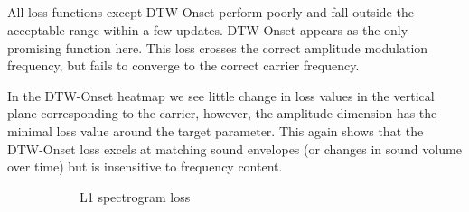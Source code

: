 \subsection{\FMMod}
All loss functions except DTW-Onset perform poorly and fall outside the acceptable range within a few updates. DTW-Onset appears as the only promising function here. This loss crosses the correct amplitude modulation frequency, but fails to converge to the correct carrier frequency. 

In the DTW-Onset heatmap we see little change in loss values in the vertical plane corresponding to the carrier, however, the amplitude dimension has the minimal loss value around the target parameter. This again shows that the DTW-Onset loss excels at matching sound envelopes (or changes in sound volume over time) but is insensitive to frequency content. 
\begin{figure}[htbp]
    \centering
    \begin{subfigure}[b]{0.49\textwidth}
        \centering
        \caption{L1 spectrogram loss}
        \label{fig:p0_spec}
    \end{subfigure}
    \hfill
    \begin{subfigure}[b]{0.49\textwidth}
        \centering

\end{subfigure}
\end{figure}
